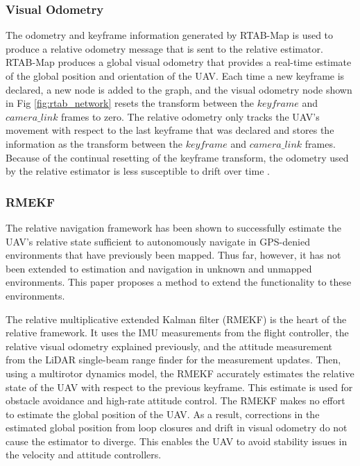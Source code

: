 \documentclass[letterpaper, 10 pt, conference]{ieeeconf}  %
\begin{document}
\subsubsection{Visual Odometry} \label{vis_odom}

The odometry and keyframe information generated by RTAB-Map is used to produce a relative odometry message that is sent to the relative estimator. RTAB-Map produces a global visual odometry that provides a real-time estimate of the global position and orientation of the UAV. Each time a new keyframe is declared, a new node is added to the graph, and the visual odometry node shown in Fig \ref{fig:rtab_network} resets the transform between the $\mathit{keyframe}$ and $\mathit{camera\_link}$ frames to zero. The relative odometry only tracks the UAV's movement with respect to the last keyframe that was declared and stores the information as the transform between the $\mathit{keyframe}$ and $\mathit{camera\_link}$ frames. Because of the continual resetting of the keyframe transform, the odometry used by the relative estimator is less susceptible to drift over time \cite{Leishman2014relative}.

\subsubsection{RMEKF}

The relative navigation framework \cite{Wheeler2017,Wheeler2018,Koch2017} has been shown to successfully estimate the UAV's relative state sufficient to autonomously navigate in GPS-denied environments that have previously been mapped. Thus far, however, it has not been extended to estimation and navigation in unknown and unmapped environments. This paper proposes a method to extend the functionality to these environments.

The relative multiplicative extended Kalman filter (RMEKF) is the heart of the relative framework. It uses the IMU measurements from the flight controller, the relative visual odometry explained previously, and the attitude measurement from the LiDAR single-beam range finder for the measurement updates. Then, using a multirotor dynamics model, the RMEKF accurately estimates the relative state of the UAV with respect to the previous keyframe. This estimate is used for obstacle avoidance and high-rate attitude control. The RMEKF makes no effort to estimate the global position of the UAV. As a result, corrections in the estimated global position from loop closures and drift in visual odometry do not cause the estimator to diverge. This enables the UAV to avoid stability issues in the velocity and attitude controllers.
\end{document}
